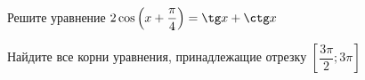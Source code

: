 \begin{ex}
	\begin{condition}
		\begin{enumcols}[label=\asbuk*)]
			\item Решите уравнение \(  2\cos{\left(x +\dfrac{\pi}{4}\right)} = \tg x + \ctg x  \)
			\item Найдите все корни уравнения, принадлежащие отрезку \( \left[\dfrac{3\pi}{2};3\pi\right] \)
		\end{enumcols}
	\end{condition}
\end{ex}